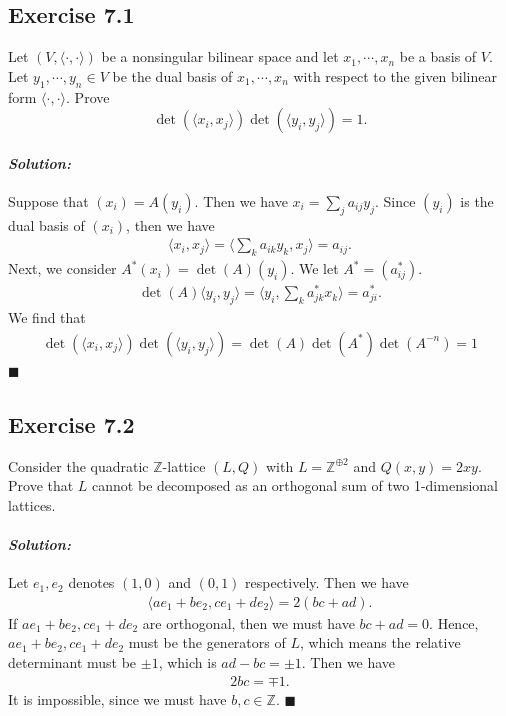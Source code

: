 \documentclass[12pt, a4paper]{article}
\newenvironment{solution}
  {\paragraph{\textit{Solution:}}\par\medskip}
  {\hfill$\blacksquare$\vspace{0.1cm}}
\begin{document}
\subsection*{Exercise 7.1}
Let $(V,\langle \cdot,\cdot \rangle)$ be a nonsingular bilinear space and let $x_1,\cdots,x_n$ be a basis of $V$. Let $y_1,\cdots,y_n \in V$ be the dual basis of $x_1,\cdots,x_n$ with respect to the given bilinear form $\langle \cdot,\cdot \rangle$. Prove
\[
    \det(\langle x_i, x_j \rangle) \det(\langle y_i, y_j \rangle) = 1.
\]
\begin{solution}
    Suppose that $(x_i)=A(y_i)$. Then we have $x_i = \sum_{j}a_{ij}y_j$.
    Since $(y_i)$ is the dual basis of $(x_i)$, then we have 
    \begin{align*}
        \langle x_i,x_j\rangle = \langle \sum_{k}a_{ik}y_k,x_j\rangle = a_{ij}.
    \end{align*}
    Next, we consider $A^* (x_i) = \det(A)(y_i)$. We let $A^*=(a^*_{ij})$.
    \begin{align*}
        \det(A)\langle y_i,y_j\rangle = \langle y_i,\sum_{k}a^*_{jk}x_k\rangle = a_{ji}^*.
    \end{align*}
    We find that 
    \begin{align*}
        \det(\langle x_i, x_j \rangle) \det(\langle y_i, y_j \rangle) = \det(A)\det(A^*)\det(A^{-n})=1
    \end{align*}
\end{solution}


\subsection*{Exercise 7.2}
Consider the quadratic $\mathbb{Z}$-lattice $(L, Q)$ with $L = \mathbb{Z}^{\oplus 2}$ and $Q(x,y) = 2xy$.
Prove that $L$ cannot be decomposed as an orthogonal sum of two 1-dimensional lattices.

\begin{solution}
    Let $e_1,e_2$ denotes $(1,0)$ and $(0,1)$ respectively. Then we have 
    \begin{align*}
        \langle ae_1+be_2,c e_1+de_2 \rangle =2(bc+ad).
    \end{align*}
    If $ae_1+be_2,c e_1+de_2$ are orthogonal, then we must have $bc+ad=0$.
    Hence, $ae_1+be_2,c e_1+de_2$ must be the generators of $L$, which means the relative determinant must be $\pm 1$, which is $ad-bc=\pm 1$.
    Then we have 
    \begin{align*}
        2bc = \mp 1.
    \end{align*}
    It is impossible, since we must have $b,c\in\mathbb{Z}$.
\end{solution}
\end{document}
